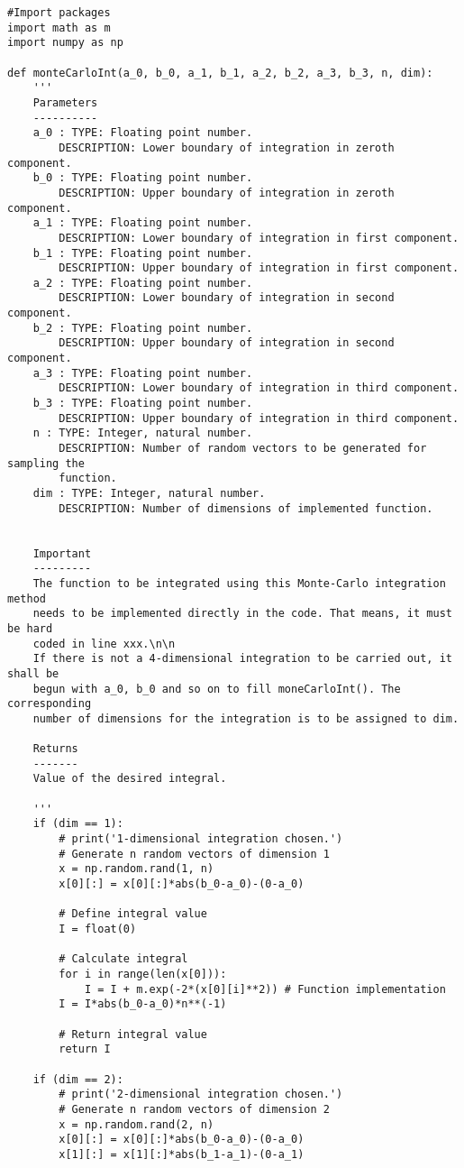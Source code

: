 \documentclass[a4paper,12pt]{article}
\begin{document}
\begin{Verbatim}[breaklines = true, breakanywhere = true]
#Import packages
import math as m
import numpy as np 

def monteCarloInt(a_0, b_0, a_1, b_1, a_2, b_2, a_3, b_3, n, dim):
	'''
	Parameters
	----------
	a_0 : TYPE: Floating point number.
		DESCRIPTION: Lower boundary of integration in zeroth component.
	b_0 : TYPE: Floating point number.
		DESCRIPTION: Upper boundary of integration in zeroth component.
	a_1 : TYPE: Floating point number.
		DESCRIPTION: Lower boundary of integration in first component.
	b_1 : TYPE: Floating point number.
		DESCRIPTION: Upper boundary of integration in first component.
	a_2 : TYPE: Floating point number.
		DESCRIPTION: Lower boundary of integration in second component.
	b_2 : TYPE: Floating point number.
		DESCRIPTION: Upper boundary of integration in second component.
	a_3 : TYPE: Floating point number.
		DESCRIPTION: Lower boundary of integration in third component.
	b_3 : TYPE: Floating point number.
		DESCRIPTION: Upper boundary of integration in third component.
	n : TYPE: Integer, natural number.
		DESCRIPTION: Number of random vectors to be generated for sampling the
		function.
	dim : TYPE: Integer, natural number.
		DESCRIPTION: Number of dimensions of implemented function.

		
	Important
	---------
	The function to be integrated using this Monte-Carlo integration method
	needs to be implemented directly in the code. That means, it must be hard
	coded in line xxx.\n\n
	If there is not a 4-dimensional integration to be carried out, it shall be
	begun with a_0, b_0 and so on to fill moneCarloInt(). The corresponding
	number of dimensions for the integration is to be assigned to dim.

	Returns
	-------
	Value of the desired integral.

	'''
	if (dim == 1):
		# print('1-dimensional integration chosen.') 
		# Generate n random vectors of dimension 1
		x = np.random.rand(1, n)
		x[0][:] = x[0][:]*abs(b_0-a_0)-(0-a_0)
		
		# Define integral value
		I = float(0)
		
		# Calculate integral
		for i in range(len(x[0])):
			I = I + m.exp(-2*(x[0][i]**2)) # Function implementation
		I = I*abs(b_0-a_0)*n**(-1)
		
		# Return integral value
		return I
	
	if (dim == 2):
		# print('2-dimensional integration chosen.')
		# Generate n random vectors of dimension 2
		x = np.random.rand(2, n)
		x[0][:] = x[0][:]*abs(b_0-a_0)-(0-a_0)
		x[1][:] = x[1][:]*abs(b_1-a_1)-(0-a_1)
		

\end{Verbatim}
\end{document}
